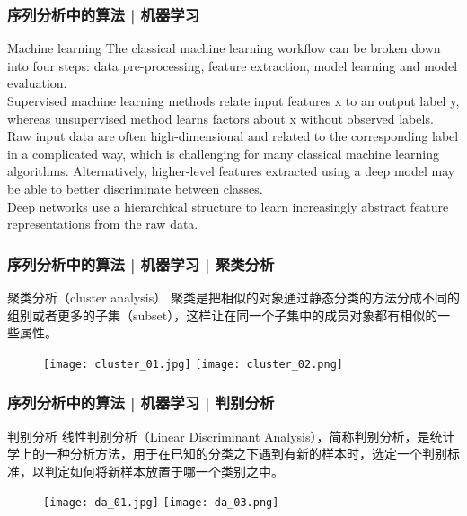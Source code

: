 \begin{frame}
  \frametitle{序列分析中的算法 | 机器学习}
  \begin{block}{Machine learning}
    The classical machine learning workflow can be broken down into four steps: data pre-processing, feature extraction, model learning and model evaluation.\\
    \vspace{0.5em}
    Supervised machine learning methods relate input features x to an output label y, whereas unsupervised method learns factors about x without observed labels.\\
    \vspace{0.5em}
    Raw input data are often high-dimensional and related to the corresponding label in a complicated way, which is challenging for many classical machine learning algorithms. Alternatively, higher-level features extracted using a deep model may be able to better discriminate between classes.\\
    \vspace{0.5em}
    Deep networks use a hierarchical structure to learn increasingly abstract feature representations from the raw data.
  \end{block}
\end{frame}

\begin{frame}
  \frametitle{序列分析中的算法 | 机器学习 | 聚类分析}
  \begin{block}{聚类分析（cluster analysis）}
    聚类是把相似的对象通过静态分类的方法分成不同的组别或者更多的子集（subset），这样让在同一个子集中的成员对象都有相似的一些属性。
  \end{block}
  \begin{figure}
    \centering
    \texttt{[image: cluster\_01.jpg]}
    \texttt{[image: cluster\_02.png]}
  \end{figure}
\end{frame}

\begin{frame}
  \frametitle{序列分析中的算法 | 机器学习 | 判别分析}
  \begin{block}{判别分析}
    线性判别分析（Linear Discriminant Analysis），简称判别分析，是统计学上的一种分析方法，用于在已知的分类之下遇到有新的样本时，选定一个判别标准，以判定如何将新样本放置于哪一个类别之中。
  \end{block}
  \begin{figure}
    \centering
    \texttt{[image: da\_01.jpg]}
    \texttt{[image: da\_03.png]}
  \end{figure}
\end{frame}

